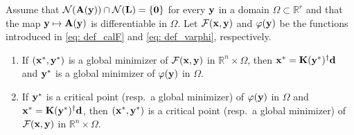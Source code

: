 \documentclass[onefignum,onetabnum]{siamart171218}
\newcommand{\bA}{{\bf A}}
\newcommand{\bK}{{\bf K}}
\newcommand{\bL}{{\bf L}}
\newcommand{\bd}{{\bf d}}
\newcommand{\bx}{{\bf x}}
\newcommand{\by}{{\bf y}}
\newcommand{\calF}{\mathcal{F}}
\newcommand{\calN}{\mathcal{N}}
\newcommand{\bbR}{\mathbb{R}}
\begin{document}
\begin{theorem} Assume that $\calN(\bA(\by))\cap \calN(\bL) = \{\boldsymbol{0}\}$ for every $\by$ in a domain $\Omega\subset \mathbb{R}^r$ and that the map $\by \mapsto \bA(\by)$ is differentiable in $\Omega$. 
    Let $\calF(\bx,\by)$ and $\varphi(\by)$ be the functions introduced in \eqref{eq: def_calF} and \eqref{eq: def_varphi}, respectively. 
    \begin{enumerate}
        \item[(1)] If $(\bx^*, \by^*)$ is a global minimizer of $\calF(\bx, \by)$ in $\bbR^n \times \Omega$, then $\bx^* = \bK(\by^*)^{\dagger}\bd$ and $\by^*$ is a global minimizer of $\varphi(\by)$ in $\Omega$.
        \item[(2)] If $\by^*$ is a critical point (resp.~a global minimizer) of $\varphi(\by)$ in $\Omega$ and $\bx^*= \bK(\by^*)^{\dagger}\bd$, then $(\bx^*, \by^*)$ is a critical point (resp.~a global minimizer) of $\calF(\bx, \by)$ in $\bbR^n \times \Omega$.
    \end{enumerate}
\end{theorem}
\end{document}

